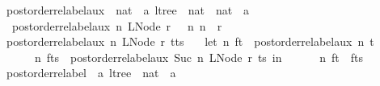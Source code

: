 \begin{isabellebody}
\isanewline
{}\isamarkupfalse%
\ postorder{\isacharunderscore}{\kern0pt}relabel{\isacharunderscore}{\kern0pt}aux\ {\isacharcolon}{\kern0pt}{\isacharcolon}{\kern0pt}\ {\isachardoublequoteopen}nat\ {\isasymRightarrow}\ {\isacharprime}{\kern0pt}a\ ltree\ {\isasymRightarrow}\ nat\ {\isasymtimes}\ {\isacharparenleft}{\kern0pt}nat\ {\isasymrightharpoonup}\ {\isacharprime}{\kern0pt}a{\isacharparenright}{\kern0pt}{\isachardoublequoteclose}\ \isanewline
\ \ {\isachardoublequoteopen}postorder{\isacharunderscore}{\kern0pt}relabel{\isacharunderscore}{\kern0pt}aux\ n\ {\isacharparenleft}{\kern0pt}LNode\ r\ {\isacharbrackleft}{\kern0pt}{\isacharbrackright}{\kern0pt}{\isacharparenright}{\kern0pt}\ {\isacharequal}{\kern0pt}\ {\isacharparenleft}{\kern0pt}n{\isacharcomma}{\kern0pt}\ {\isacharbrackleft}{\kern0pt}n\ {\isasymmapsto}\ r{\isacharbrackright}{\kern0pt}{\isacharparenright}{\kern0pt}{\isachardoublequoteclose}\isanewline
{\isacharbar}{\kern0pt}\ {\isachardoublequoteopen}postorder{\isacharunderscore}{\kern0pt}relabel{\isacharunderscore}{\kern0pt}aux\ n\ {\isacharparenleft}{\kern0pt}LNode\ r\ {\isacharparenleft}{\kern0pt}t{\isacharhash}{\kern0pt}ts{\isacharparenright}{\kern0pt}{\isacharparenright}{\kern0pt}\ {\isacharequal}{\kern0pt}\isanewline
\ \ {\isacharparenleft}{\kern0pt}let\ {\isacharparenleft}{\kern0pt}n{\isacharprime}{\kern0pt}{\isacharcomma}{\kern0pt}\ f\isactrlsub t{\isacharparenright}{\kern0pt}\ {\isacharequal}{\kern0pt}\ postorder{\isacharunderscore}{\kern0pt}relabel{\isacharunderscore}{\kern0pt}aux\ n\ t{\isacharsemicolon}{\kern0pt}\isanewline
\ \ \ \ \ \ {\isacharparenleft}{\kern0pt}n{\isacharprime}{\kern0pt}{\isacharprime}{\kern0pt}{\isacharcomma}{\kern0pt}\ f\isactrlsub t\isactrlsub s{\isacharparenright}{\kern0pt}\ {\isacharequal}{\kern0pt}\ postorder{\isacharunderscore}{\kern0pt}relabel{\isacharunderscore}{\kern0pt}aux\ {\isacharparenleft}{\kern0pt}Suc\ n{\isacharprime}{\kern0pt}{\isacharparenright}{\kern0pt}\ {\isacharparenleft}{\kern0pt}LNode\ r\ ts{\isacharparenright}{\kern0pt}\ in\isanewline
\ \ \ \ \ \ {\isacharparenleft}{\kern0pt}n{\isacharprime}{\kern0pt}{\isacharprime}{\kern0pt}{\isacharcomma}{\kern0pt}\ f\isactrlsub t\ {\isacharplus}{\kern0pt}{\isacharplus}{\kern0pt}\ f\isactrlsub t\isactrlsub s{\isacharparenright}{\kern0pt}{\isacharparenright}{\kern0pt}{\isachardoublequoteclose}\isanewline
\isanewline
{}\isamarkupfalse%
\ postorder{\isacharunderscore}{\kern0pt}relabel\ {\isacharcolon}{\kern0pt}{\isacharcolon}{\kern0pt}\ {\isachardoublequoteopen}{\isacharprime}{\kern0pt}a\ ltree\ {\isasymRightarrow}\ {\isacharparenleft}{\kern0pt}nat\ {\isasymrightharpoonup}\ {\isacharprime}{\kern0pt}a{\isacharparenright}{\kern0pt}{\isachardoublequoteclose}\ \isanewline

\end{isabellebody}
